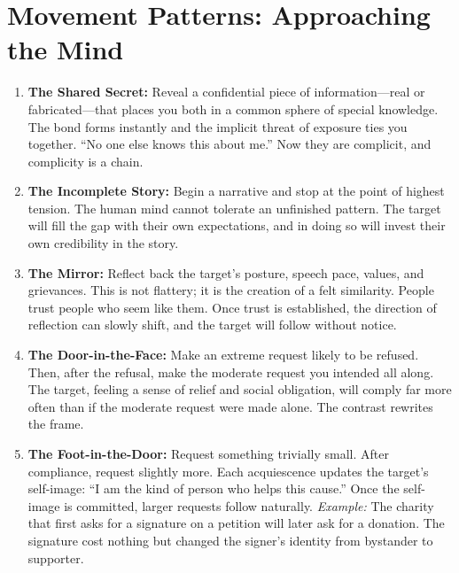 \documentclass[12pt,a4paper,oneside]{book}
\begin{document}
\section{Movement Patterns: Approaching the Mind}
\begin{enumerate}[leftmargin=*, label=\arabic*.]
\item \textbf{The Shared Secret:} Reveal a confidential piece of information—real or fabricated—that places you both in a common sphere of special knowledge. The bond forms instantly and the implicit threat of exposure ties you together. “No one else knows this about me.” Now they are complicit, and complicity is a chain.
\item \textbf{The Incomplete Story:} Begin a narrative and stop at the point of highest tension. The human mind cannot tolerate an unfinished pattern. The target will fill the gap with their own expectations, and in doing so will invest their own credibility in the story.
\item \textbf{The Mirror:} Reflect back the target's posture, speech pace, values, and grievances. This is not flattery; it is the creation of a felt similarity. People trust people who seem like them. Once trust is established, the direction of reflection can slowly shift, and the target will follow without notice.
\item \textbf{The Door-in-the-Face:} Make an extreme request likely to be refused. Then, after the refusal, make the moderate request you intended all along. The target, feeling a sense of relief and social obligation, will comply far more often than if the moderate request were made alone. The contrast rewrites the frame.
\item \textbf{The Foot-in-the-Door:} Request something trivially small. After compliance, request slightly more. Each acquiescence updates the target's self-image: “I am the kind of person who helps this cause.” Once the self-image is committed, larger requests follow naturally. \textit{Example:} The charity that first asks for a signature on a petition will later ask for a donation. The signature cost nothing but changed the signer's identity from bystander to supporter.
\end{enumerate}
\end{document}
